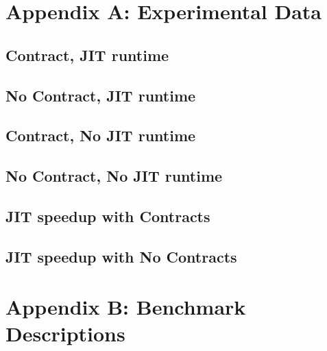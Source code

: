 \newpage
\appendix
\section*{Appendix A: Experimental Data}

\subsection*{Contract, JIT runtime}


\newpage
\subsection*{No Contract, JIT runtime}


\newpage
\subsection*{Contract, No JIT runtime}
\vspace{1cm}


\newpage
\subsection*{No Contract, No JIT runtime}
\vspace{1cm}


\newpage
\subsection*{JIT speedup with Contracts}
\vspace{1cm}


\subsection*{JIT speedup with No Contracts}
\vspace{1cm}


\newpage
\section*{Appendix B: Benchmark Descriptions}
